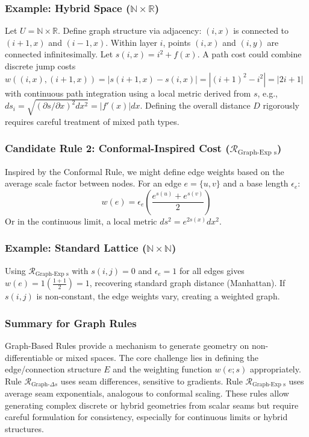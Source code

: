 \documentclass[twoside,twocolumn]{article}
\begin{document}
\subsubsection{Example: Hybrid Space ($\mathbb{N} \times \mathbb{R}$)}
Let $U = \mathbb{N} \times \mathbb{R}$. Define graph structure via adjacency: $(i, x)$ is connected to $(i+1, x)$ and $(i-1, x)$. Within layer $i$, points $(i, x)$ and $(i, y)$ are connected infinitesimally. Let $s(i, x) = i^2 + f(x)$. A path cost could combine discrete jump costs $w((i,x), (i+1,x)) = |s(i+1,x)-s(i,x)| = |(i+1)^2-i^2| = |2i+1|$ with continuous path integration using a local metric derived from $s$, e.g., $ds_{i} = \sqrt{(\partial s / \partial x)^2 dx^2} = |f'(x)|dx$. Defining the overall distance $D$ rigorously requires careful treatment of mixed path types.

\subsubsection{Candidate Rule 2: Conformal-Inspired Cost ($\mathcal{R}_{\text{Graph-Exp s}}$)}
Inspired by the Conformal Rule, we might define edge weights based on the average scale factor between nodes. For an edge $e=\{u, v\}$ and a base length $\epsilon_e$:
$$ w(e) = \epsilon_e \left( \frac{e^{s(u)} + e^{s(v)}}{2} \right) $$
Or in the continuous limit, a local metric $ds^2 = e^{2s(x)} dx^2$.

\subsubsection{Example: Standard Lattice ($\mathbb{N} \times \mathbb{N}$)}
Using $\mathcal{R}_{\text{Graph-Exp s}}$ with $s(i, j)=0$ and $\epsilon_e=1$ for all edges gives $w(e) = 1 (\frac{1+1}{2}) = 1$, recovering standard graph distance (Manhattan). If $s(i,j)$ is non-constant, the edge weights vary, creating a weighted graph.

\subsubsection{Summary for Graph Rules}
Graph-Based Rules provide a mechanism to generate geometry on non-differentiable or mixed spaces. The core challenge lies in defining the edge/connection structure $E$ and the weighting function $w(e; s)$ appropriately. Rule $\mathcal{R}_{\text{Graph-}\Delta s}$ uses seam differences, sensitive to gradients. Rule $\mathcal{R}_{\text{Graph-Exp s}}$ uses average seam exponentials, analogous to conformal scaling. These rules allow generating complex discrete or hybrid geometries from scalar seams but require careful formulation for consistency, especially for continuous limits or hybrid structures.
\end{document}
